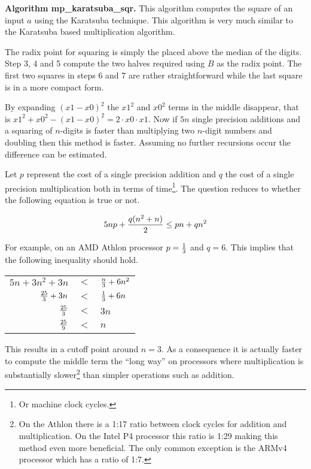 \documentclass[b5paper]{book}
\begin{document}
\textbf{Algorithm mp\_karatsuba\_sqr.}
This algorithm computes the square of an input $a$ using the Karatsuba technique.  This algorithm is very much similar to the Karatsuba based
multiplication algorithm.  

The radix point for squaring is simply the placed above the median of the digits.  Step 3, 4 and 5 compute the two halves required using $B$
as the radix point.  The first two squares in steps 6 and 7 are rather straightforward while the last square is in a more compact form.

By expanding $\left (x1 - x0 \right )^2$ the $x1^2$ and $x0^2$ terms in the middle disappear, that is $x1^2 + x0^2 - (x1 - x0)^2 = 2 \cdot x0 \cdot x1$.
Now if $5n$ single precision additions and a squaring of $n$-digits is faster than multiplying two $n$-digit numbers and doubling then
this method is faster.  Assuming no further recursions occur the difference can be estimated.

Let $p$ represent the cost of a single precision addition and $q$ the cost of a single precision multiplication both in terms of time\footnote{Or
machine clock cycles.}.  The question reduces to whether the following equation is true or not.

\begin{equation}
5np +{{q(n^2 + n)} \over 2} \le pn + qn^2
\end{equation}

For example, on an AMD Athlon processor $p = {1 \over 3}$ and $q = 6$.  This implies that the following inequality should hold.
\begin{center}
\begin{tabular}{rcl}
$5n + 3n^2 + 3n$     & $<$ & ${n \over 3} + 6n^2$ \\
${25 \over 3} + 3n$  & $<$ & ${1 \over 3} + 6n$ \\
${25 \over 3}$       & $<$ & $3n$ \\
${25 \over 9}$       & $<$ & $n$ \\
\end{tabular}
\end{center}

This results in a cutoff point around $n = 3$.  As a consequence it is actually faster to compute the middle term the ``long way'' on processors
where multiplication is substantially slower\footnote{On the Athlon there is a 1:17 ratio between clock cycles for addition and multiplication.  On
the Intel P4 processor this ratio is 1:29 making this method even more beneficial.  The only common exception is the ARMv4 processor which has a
ratio of 1:7.  } than simpler operations such as addition.  
\end{document}
